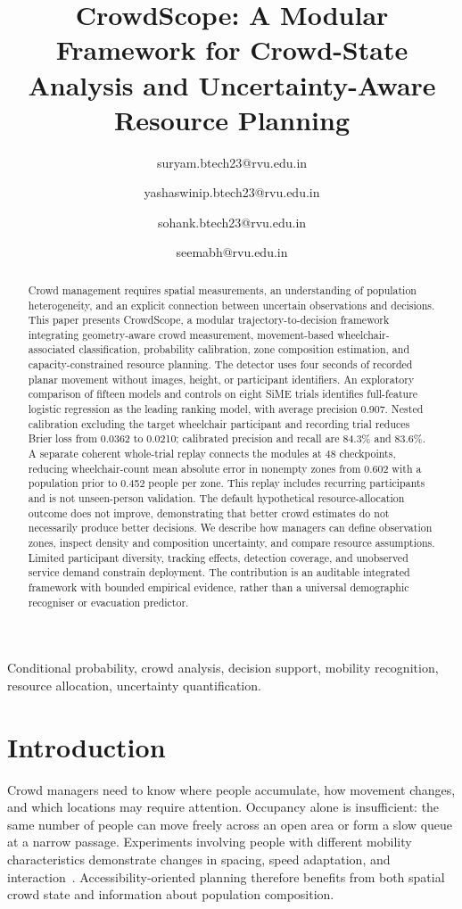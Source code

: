 \documentclass[conference]{IEEEtran}
\title{CrowdScope: A Modular Framework for Crowd-State Analysis and Uncertainty-Aware Resource Planning}
\author{\IEEEauthorblockN{Surya Maheswaran}
\IEEEauthorblockA{\textit{Btech. (Hons), SoCSE} \\
\textit{RV University}\\
Bengaluru, India \\}
{suryam.btech23@rvu.edu.in}
\and
\IEEEauthorblockN{Yashaswini Pawar}
\IEEEauthorblockA{\textit{Btech. (Hons), SoCSE} \\
\textit{RV University}\\
Bengaluru, India \\}
{yashaswinip.btech23@rvu.edu.in}
\and
\IEEEauthorblockN{Sohan Kori}
\IEEEauthorblockA{\textit{Btech. (Hons), SoCSE} \\
\textit{RV University}\\
Bengaluru, India \\}
{sohank.btech23@rvu.edu.in}
\and
\IEEEauthorblockN{Dr. Seema B Hegde}
\IEEEauthorblockA{\textit{SoCSE} \\
\textit{RV University}\\
Bengaluru, India \\}
{seemabh@rvu.edu.in}
}
\begin{document}
\maketitle
\begin{abstract}
Crowd management requires spatial measurements, an understanding of population heterogeneity, and an explicit connection between uncertain observations and decisions. This paper presents CrowdScope, a modular trajectory-to-decision framework integrating geometry-aware crowd measurement, movement-based wheelchair-associated classification, probability calibration, zone composition estimation, and capacity-constrained resource planning. The detector uses four seconds of recorded planar movement without images, height, or participant identifiers. An exploratory comparison of fifteen models and controls on eight SiME trials identifies full-feature logistic regression as the leading ranking model, with average precision 0.907. Nested calibration excluding the target wheelchair participant and recording trial reduces Brier loss from 0.0362 to 0.0210; calibrated precision and recall are 84.3\% and 83.6\%. A separate coherent whole-trial replay connects the modules at 48 checkpoints, reducing wheelchair-count mean absolute error in nonempty zones from 0.602 with a population prior to 0.452 people per zone. This replay includes recurring participants and is not unseen-person validation. The default hypothetical resource-allocation outcome does not improve, demonstrating that better crowd estimates do not necessarily produce better decisions. We describe how managers can define observation zones, inspect density and composition uncertainty, and compare resource assumptions. Limited participant diversity, tracking effects, detection coverage, and unobserved service demand constrain deployment. The contribution is an auditable integrated framework with bounded empirical evidence, rather than a universal demographic recogniser or evacuation predictor.
\end{abstract}
\begin{IEEEkeywords}
Conditional probability, crowd analysis, decision support, mobility recognition, resource allocation, uncertainty quantification.
\end{IEEEkeywords}

\section{Introduction}
Crowd managers need to know where people accumulate, how movement changes, and which locations may require attention. Occupancy alone is insufficient: the same number of people can move freely across an open area or form a slow queue at a narrow passage. Experiments involving people with different mobility characteristics demonstrate changes in spacing, speed adaptation, and interaction~\cite{sime,geoerg}. Accessibility-oriented planning therefore benefits from both spatial crowd state and information about population composition.
\end{document}
